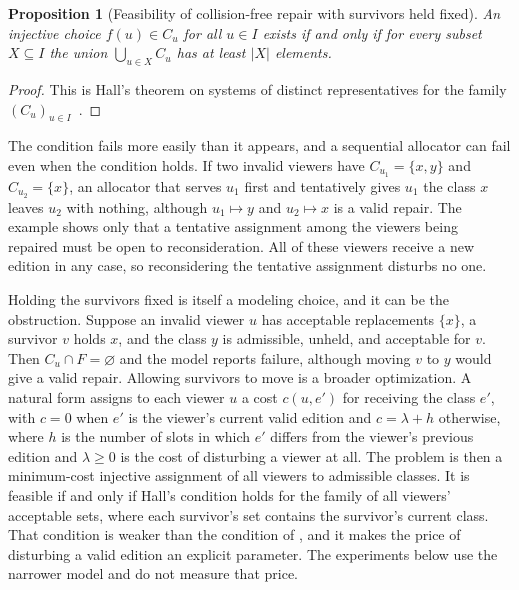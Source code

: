 \documentclass[11pt,twoside,openright]{book}
\theoremstyle{plain}
\newtheorem{proposition}[theorem]{Proposition}
\theoremstyle{definition}
\theoremstyle{remark}
\begin{document}
\begin{proposition}[Feasibility of collision-free repair with survivors held fixed]\label{prop:hall}
An injective choice $f(u)\in C_u$ for all $u\in I$ exists if and only if for every subset $X\subseteq I$ the union $\bigcup_{u\in X}C_u$ has at least $\lvert X\rvert$ elements.
\end{proposition}

\begin{proof}
This is Hall's theorem on systems of distinct representatives for the family $(C_u)_{u\in I}$~\cite{hall1935}.
\end{proof}

The condition fails more easily than it appears, and a sequential allocator can fail even when the condition holds. If two invalid viewers have $C_{u_1}=\{x,y\}$ and $C_{u_2}=\{x\}$, an allocator that serves $u_1$ first and tentatively gives $u_1$ the class $x$ leaves $u_2$ with nothing, although $u_1\mapsto y$ and $u_2\mapsto x$ is a valid repair. The example shows only that a tentative assignment among the viewers being repaired must be open to reconsideration. All of these viewers receive a new edition in any case, so reconsidering the tentative assignment disturbs no one.

Holding the survivors fixed is itself a modeling choice, and it can be the obstruction. Suppose an invalid viewer $u$ has acceptable replacements $\{x\}$, a survivor $v$ holds $x$, and the class $y$ is admissible, unheld, and acceptable for $v$. Then $C_u\cap F=\varnothing$ and the model reports failure, although moving $v$ to $y$ would give a valid repair. Allowing survivors to move is a broader optimization. A natural form assigns to each viewer $u$ a cost $c(u,e')$ for receiving the class $e'$, with $c=0$ when $e'$ is the viewer's current valid edition and $c=\lambda+h$ otherwise, where $h$ is the number of slots in which $e'$ differs from the viewer's previous edition and $\lambda\ge0$ is the cost of disturbing a viewer at all. The problem is then a minimum-cost injective assignment of all viewers to admissible classes. It is feasible if and only if Hall's condition holds for the family of all viewers' acceptable sets, where each survivor's set contains the survivor's current class. That condition is weaker than the condition of , and it makes the price of disturbing a valid edition an explicit parameter. The experiments below use the narrower model and do not measure that price.
\end{document}
